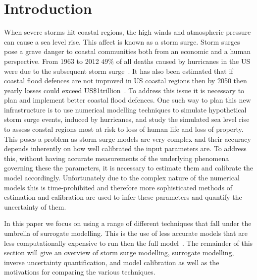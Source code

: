 \documentclass[12pt,a4paper]{article}
\begin{document}
\section{Introduction}
\noindent
When severe storms hit coastal regions, the high winds and atmospheric pressure can cause a sea level rise. This affect is known as a storm surge. Storm surges pose a grave danger to coastal communities both from an economic and a human perspective. From 1963 to 2012 $49\%$ of all deaths caused by hurricanes in the US were due to the subsequent storm surge~\cite{deaths}. It has also been estimated that if coastal flood defences are not improved in US coastal regions then by 2050 then yearly losses could exceed US\$1trillion~\cite{costs}.  To address this issue it is necessary to plan and implement better coastal flood defences. One such way to plan this new infrastructure is to use numerical modelling techniques to simulate hypothetical storm surge events, induced by hurricanes, and study the simulated sea level rise to assess coastal regions most at risk to loss of human life and loss of property. This poses a problem as storm surge models are very complex and their accuracy depends inherently on how well calibrated the input parameters are. To address this, without having accurate measurements of the underlying phenomena governing these the parameters, it is necessary to estimate them and calibrate the model accordingly. Unfortunately due to the complex nature of the numerical models this is time-prohibited and therefore more sophisticated methods of estimation and calibration are used to infer these parameters and quantify the uncertainty of them.

In this paper we focus on using a range of different techniques that fall under the umbrella of surrogate modelling. This is the use of less accurate models that are less computationally expensive to run then the full model~\cite{quirante}. The remainder of this section will give an overview of storm surge modelling, surrogate modelling, inverse uncertainty quantification, and model calibration as well as the motivations for comparing the various techniques.
\end{document}
